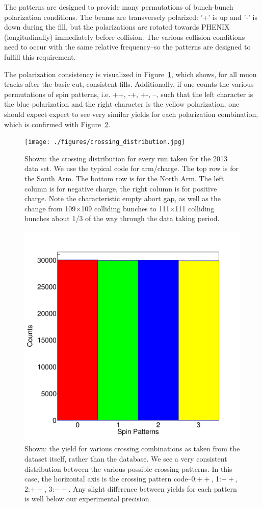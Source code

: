 The patterns are designed to provide many permutations of bunch-bunch
polarization conditions. The beams are transversely polarized: '+' is up and '-'
is down during the fill, but the polarizations are rotated towards PHENIX
(longitudinally) immediately before collision. The various collision conditions
need to occur with the same relative frequency--so the patterns are designed to
fulfill this requirement.

The polarization consistency is visualized in Figure~\ref{fig:crossing_count},
which shows, for all muon tracks after the basic cut, consistent fills.
Additionally, if one counts the various permutations of spin patterns, i.e. ++,
-+, +-, --, such that the left character is the blue polarization and the right
character is the yellow polarization, one should expect expect to see very
similar yields for each polarization combination, which is confirmed with
Figure~\ref{fig:polarization_counts}.

\begin{figure}
  \centering
  \texttt{[image: ./figures/crossing\_distribution.jpg]}
  \caption{
    Shown: the crossing distribution for every run taken for the 2013 data
    set. We use the typical code for arm/charge. The top row is for the South
    Arm. The bottom row is for the North Arm. The left column is for negative
    charge, the right column is for positive charge. Note the characteristic
    empty abort gap, as well as the change from 109$\times$109 colliding bunches
    to 111$\times$111 colliding bunches about 1/3 of the way through the data
    taking period.
  }
  \label{fig:crossing_count}
\end{figure}

\begin{figure}
  \centering
  \includegraphics[width=0.6\linewidth]{./figures/crossing_pattenr_count.jpg}
  \caption{
    Shown: the yield for various crossing combinations as taken from
    the dataset itself, rather than the database. We see a very consistent
    distribution between the various possible crossing patterns. In this case,
    the horizontal axis is the crossing pattern code--0:$++$, 1:$-+$, 2:$+-$,
    3:$--$. Any slight difference between yields for each pattern is well below
    our experimental precision.
  }
  \label{fig:polarization_counts}
\end{figure}

